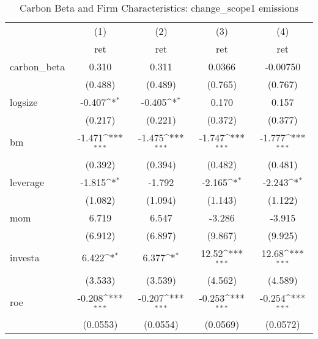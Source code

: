 \begin{table}[htbp]\centering
\def\sym#1{\ifmmode^{#1}\else\(^{#1}\)\fi}
\caption{Carbon Beta and Firm Characteristics: change\_scope1 emissions}
\begin{tabular}{l*{4}{c}}
\hline\hline
                    &\multicolumn{1}{c}{(1)}&\multicolumn{1}{c}{(2)}&\multicolumn{1}{c}{(3)}&\multicolumn{1}{c}{(4)}\\
                    &\multicolumn{1}{c}{ret}&\multicolumn{1}{c}{ret}&\multicolumn{1}{c}{ret}&\multicolumn{1}{c}{ret}\\
\hline
carbon\_beta         &       0.310         &       0.311         &      0.0366         &    -0.00750         \\
                    &     (0.488)         &     (0.489)         &     (0.765)         &     (0.767)         \\
[1em]
logsize             &      -0.407\sym{*}  &      -0.405\sym{*}  &       0.170         &       0.157         \\
                    &     (0.217)         &     (0.221)         &     (0.372)         &     (0.377)         \\
[1em]
bm                  &      -1.471\sym{***}&      -1.475\sym{***}&      -1.747\sym{***}&      -1.777\sym{***}\\
                    &     (0.392)         &     (0.394)         &     (0.482)         &     (0.481)         \\
[1em]
leverage            &      -1.815\sym{*}  &      -1.792         &      -2.165\sym{*}  &      -2.243\sym{*}  \\
                    &     (1.082)         &     (1.094)         &     (1.143)         &     (1.122)         \\
[1em]
mom                 &       6.719         &       6.547         &      -3.286         &      -3.915         \\
                    &     (6.912)         &     (6.897)         &     (9.867)         &     (9.925)         \\
[1em]
investa             &       6.422\sym{*}  &       6.377\sym{*}  &       12.52\sym{***}&       12.68\sym{***}\\
                    &     (3.533)         &     (3.539)         &     (4.562)         &     (4.589)         \\
[1em]
roe                 &      -0.208\sym{***}&      -0.207\sym{***}&      -0.253\sym{***}&      -0.254\sym{***}\\
                    &    (0.0553)         &    (0.0554)         &    (0.0569)         &    (0.0572)         \\

\end{tabular}
\end{table}
